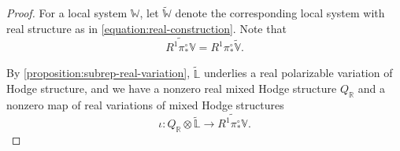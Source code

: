 \documentclass[12 pt]{amsart}
\theoremstyle{plain}
\theoremstyle{definition}
\theoremstyle{remark}
\numberwithin{equation}{section}
\DeclareMathOperator\rk{rk}
\begin{document}
\begin{proof}
For a local system $\mathbb W$, let $\widetilde{\mathbb W}$ denote the
corresponding local system with real structure as in
\eqref{equation:real-construction}. Note that $$\widetilde{R^1 \pi^\circ_* \mathbb{V}}=R^1 \pi^\circ_* \widetilde{\mathbb{V}}.$$

By \autoref{proposition:subrep-real-variation}, $\widetilde{\mathbb{L}}$
underlies a real polarizable variation of Hodge structure, and we have a
nonzero real mixed Hodge structure $Q_{\mathbb R}$ and a nonzero map of real
variations of mixed Hodge structures
$$\iota: Q_{\mathbb R} \otimes \widetilde{\mathbb L} \to \widetilde{R^1 \pi^\circ_* \mathbb V}.$$  
%
%

\end{proof}
\end{document}
